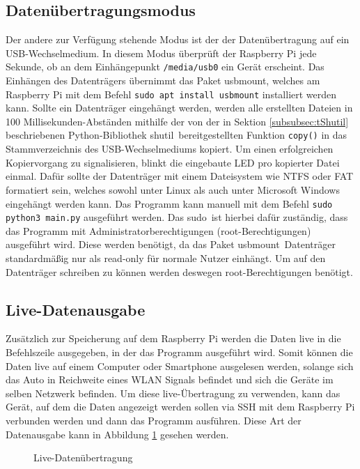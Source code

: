 \subsection{Datenübertragungsmodus}
\label{subsec:Datenübertragungsmodus}
Der andere zur Verfügung stehende Modus ist der der Datenübertragung auf ein \ac{USB}-Wechselmedium. In diesem Modus überprüft der Raspberry Pi jede Sekunde, ob an dem Einhängepunkt \verb|/media/usb0| ein Gerät erscheint. Das Einhängen des Datenträgers übernimmt das Paket \glqq usbmount\grqq , welches am Raspberry Pi mit dem Befehl \verb|sudo apt install usbmount| installiert werden kann. Sollte ein Datenträger eingehängt werden, werden alle erstellten Dateien in 100 Millisekunden-Abständen mithilfe der von der in Sektion \ref{subsubsec:tShutil} beschriebenen Python-Bibliothek \glqq shutil\grqq\ bereitgestellten Funktion \verb|copy()| in das Stammverzeichnis des \ac{USB}-Wechselmediums kopiert. Um einen erfolgreichen Kopiervorgang zu signalisieren, blinkt die eingebaute \ac{LED} pro kopierter Datei einmal. Dafür sollte der Datenträger mit einem Dateisystem wie \ac{NTFS} oder \ac{FAT} formatiert sein, welches sowohl unter Linux als auch unter Microsoft Windows eingehängt werden kann. Das Programm kann manuell mit dem Befehl \verb|sudo python3 main.py| ausgeführt werden. Das \glqq sudo\grqq\ ist hierbei dafür zuständig, dass das Programm mit Administratorberechtigungen (root-Berechtigungen) ausgeführt wird. Diese werden benötigt, da das Paket \glqq usbmount\grqq\ Datenträger standardmäßig nur als read-only für normale Nutzer einhängt. Um auf den Datenträger schreiben zu können werden deswegen root-Berechtigungen benötigt.
\subsection{Live-Datenausgabe}
\label{subsec:LiveDatenausgabe}
Zusätzlich zur Speicherung auf dem Raspberry Pi werden die Daten live in die Befehlszeile ausgegeben, in der das Programm ausgeführt wird. Somit können die Daten live auf einem Computer oder Smartphone ausgelesen werden, solange sich das Auto in Reichweite eines \ac{WLAN} Signals befindet und sich die Geräte im selben Netzwerk befinden. Um diese live-Übertragung zu verwenden, kann das Gerät, auf dem die Daten angezeigt werden sollen via \ac{SSH} mit dem Raspberry Pi verbunden werden und dann das Programm ausführen. Diese Art der Datenausgabe kann in Abbildung \ref{fig:liveDaten} gesehen werden.
\begin{figure}[h]
\centering
\missingfigure{}
\caption{Live-Datenübertragung}
\label{fig:liveDaten}
\end{figure}